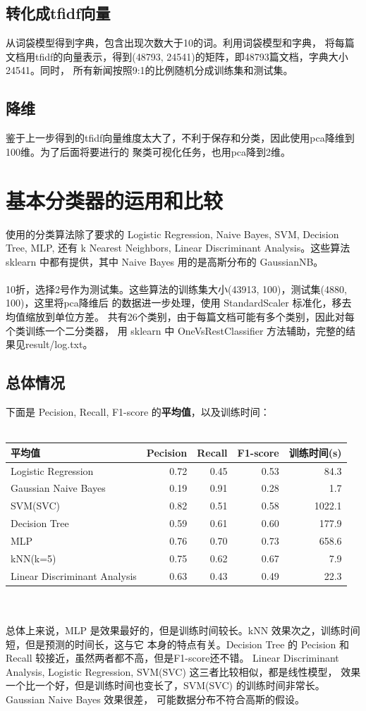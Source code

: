 \documentclass[12pt]{article}
\begin{document}
\subsection{转化成tfidf向量}
从词袋模型得到字典，包含出现次数大于10的词。利用词袋模型和字典，
将每篇文档用tfidf的向量表示，得到(48793, 24541)的矩阵，即48793篇文档，字典大小24541。同时，
所有新闻按照9:1的比例随机分成训练集和测试集。
\subsection{降维}
鉴于上一步得到的tfidf向量维度太大了，不利于保存和分类，因此使用pca降维到100维。为了后面将要进行的
聚类可视化任务，也用pca降到2维。

\section{基本分类器的运用和比较}
使用的分类算法除了要求的 Logistic Regression, Naive Bayes, SVM, Decision Tree, MLP, 还有
k Nearest Neighbors, Linear Discriminant Analysis。这些算法 sklearn 中都有提供，其中
Naive Bayes 用的是高斯分布的 GaussianNB。\\
\\
10折，选择2号作为测试集。这些算法的训练集大小(43913, 100)，测试集(4880, 100)，这里将pca降维后
的数据进一步处理，使用 StandardScaler 标准化，移去均值缩放到单位方差。
共有26个类别，由于每篇文档可能有多个类别，因此对每个类训练一个二分类器，
用 sklearn 中 OneVsRestClassifier 方法辅助，完整的结果见result/log.txt。
\subsection{总体情况}
下面是 Pecision, Recall, F1-score 的\textbf{平均值}，以及训练时间：\\
\\
\begin{tabular}{l|r|r|r|r}
  \hline
  平均值 &Pecision&Recall&F1-score&训练时间(s)\\
  \hline
  Logistic Regression& 0.72&0.45&0.53&84.3\\
  \hline
  Gaussian Naive Bayes&0.19&0.91&0.28& 1.7\\
  \hline
  SVM(SVC)&0.82&0.51&0.58& 1022.1\\
  \hline
  Decision Tree&0.59&0.61&0.60& 177.9\\
  \hline
  MLP&0.76&0.70&0.73& 658.6\\
  \hline
  kNN(k=5)&0.75&0.62&0.67& 7.9\\
  \hline
  Linear Discriminant Analysis&0.63&0.43&0.49& 22.3\\
  \hline
\end{tabular}
\\
\\
总体上来说，MLP 是效果最好的，但是训练时间较长。kNN 效果次之，训练时间短，但是预测的时间长，这与它
本身的特点有关。Decision Tree 的 Pecision 和 Recall 较接近，虽然两者都不高，但是F1-score还不错。
Linear Discriminant Analysis, Logistic Regression, SVM(SVC) 这三者比较相似，都是线性模型，
效果一个比一个好，但是训练时间也变长了，SVM(SVC) 的训练时间非常长。Gaussian Naive Bayes 效果很差，
可能数据分布不符合高斯的假设。
\\
\end{document}
